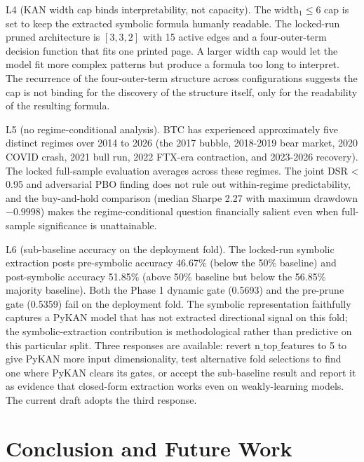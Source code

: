\documentclass[12pt,a4paper,oneside]{article}
\begin{document}
L4 (KAN width cap binds interpretability, not capacity). The $\text{width}_1 \leq 6$ cap is set to keep the extracted symbolic formula humanly readable. The locked-run pruned architecture is $[3, 3, 2]$ with 15 active edges and a four-outer-term decision function that fits one printed page. A larger width cap would let the model fit more complex patterns but produce a formula too long to interpret. The recurrence of the four-outer-term structure across configurations suggests the cap is not binding for the discovery of the structure itself, only for the readability of the resulting formula.

L5 (no regime-conditional analysis). BTC has experienced approximately five distinct regimes over 2014 to 2026 (the 2017 bubble, 2018-2019 bear market, 2020 COVID crash, 2021 bull run, 2022 FTX-era contraction, and 2023-2026 recovery). The locked full-sample evaluation averages across these regimes. The joint DSR < 0.95 and adversarial PBO finding does not rule out within-regime predictability, and the buy-and-hold comparison (median Sharpe 2.27 with maximum drawdown $-0.9998$) makes the regime-conditional question financially salient even when full-sample significance is unattainable.

L6 (sub-baseline accuracy on the deployment fold). The locked-run symbolic extraction posts pre-symbolic accuracy 46.67\% (below the 50\% baseline) and post-symbolic accuracy 51.85\% (above 50\% baseline but below the 56.85\% majority baseline). Both the Phase 1 dynamic gate (0.5693) and the pre-prune gate (0.5359) fail on the deployment fold. The symbolic representation faithfully captures a PyKAN model that has not extracted directional signal on this fold; the symbolic-extraction contribution is methodological rather than predictive on this particular split. Three responses are available: revert $\text{n\_top\_features}$ to 5 to give PyKAN more input dimensionality, test alternative fold selections to find one where PyKAN clears its gates, or accept the sub-baseline result and report it as evidence that closed-form extraction works even on weakly-learning models. The current draft adopts the third response.

\section{Conclusion and Future Work}\label{sec:conclusion}
\end{document}
